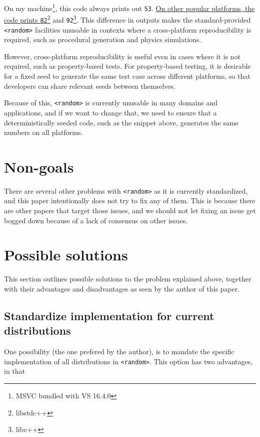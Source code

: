 \documentclass{wg21}
\begin{document}
On my machine\footnote{MSVC bundled with VS 16.4.0}, this code always
prints out \texttt{53}. \href{https://godbolt.org/z/dB7H_2}{On other
popular platforms, the code prints \texttt{82}\footnote{libstdc++} and
\texttt{92}\footnote{libc++}}. This
difference in outputs makes the standard-provided \texttt{<random>}
facilities unusable in contexts where a cross-platform reproducibility
is required, such as procedural generation and physics simulations.

However, cross-platform reproducibility is useful even in cases
where it is not required, such as property-based tests. For property-based
testing, it is desirable for a fixed seed to generate the same
test case across different platforms, so that developers can share
relevant seeds between themselves.

Because of this, \texttt{<random>} is currently unusable in many
domains and applications, and if we want to change that, we need
to ensure that a deterministically seeded code, such as the snippet
above, generates the same numbers on all platforms.

\hypertarget{non-goals}{%
    \section{Non-goals}\label{non-goals}}

There are several other problems with \texttt{<random>} as it is currently
standardized, and this paper intentionally does not try to fix any of them.
This is because there are other papers that target those issues, and we
should not let fixing an issue get bogged down because of a lack of consensus
on other issues.


\hypertarget{possible-solutions}{%
    \section{Possible solutions}\label{possible-solutions}}

This section outlines possible solutions to the problem explained above,
together with their advantages and disadvantages as seen by the author of
this paper.

\hypertarget{standardize-implementation}{%
    \subsection{Standardize implementation for current distributions}\label{possible-solutions}}

One possibility (the one prefered by the author), is to mandate the specific
implementation of all distributions in \texttt{<random>}. This option
has two advantages, in that
\end{document}

